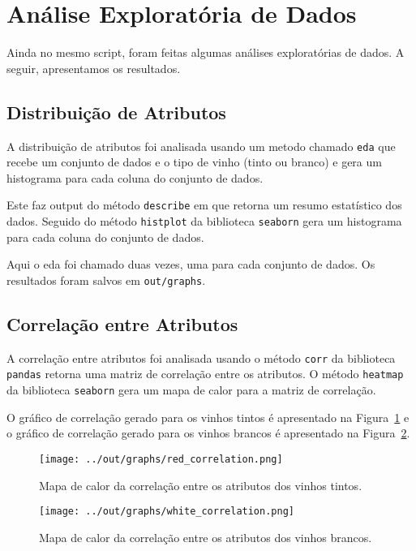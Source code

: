 \documentclass{article}
\begin{document}
\section{Análise Exploratória de Dados}

Ainda no mesmo script, foram feitas algumas análises exploratórias de dados. A seguir, apresentamos os resultados.

\subsection{Distribuição de Atributos}
A distribuição de atributos foi analisada usando um metodo chamado \texttt{eda} que recebe um conjunto de dados e o tipo de vinho (tinto ou branco) e gera um histograma para cada coluna do conjunto de dados.

Este faz output do método \texttt{describe} em que retorna um resumo estatístico dos dados. Seguido do método \texttt{histplot} da biblioteca \texttt{seaborn} gera um histograma para cada coluna do conjunto de dados.

Aqui o eda foi chamado duas vezes, uma para cada conjunto de dados. Os resultados foram salvos em \texttt{out/graphs}.

\subsection{Correlação entre Atributos}
A correlação entre atributos foi analisada usando o método \texttt{corr} da biblioteca \texttt{pandas} retorna uma matriz de correlação entre os atributos. O método \texttt{heatmap} da biblioteca \texttt{seaborn} gera um mapa de calor para a matriz de correlação.

O gráfico de correlação gerado para os vinhos tintos é apresentado na Figura~\ref{fig:corr_red} e o gráfico de correlação gerado para os vinhos brancos é apresentado na Figura~\ref{fig:corr_white}.

\begin{figure}[ht]
  \centering
  \texttt{[image: ../out/graphs/red\_correlation.png]}
  \caption{Mapa de calor da correlação entre os atributos dos vinhos tintos.}
  \label{fig:corr_red}
\end{figure}

\begin{figure}[ht]
  \centering
  \texttt{[image: ../out/graphs/white\_correlation.png]}
  \caption{Mapa de calor da correlação entre os atributos dos vinhos brancos.}
  \label{fig:corr_white}
\end{figure}
\end{document}
